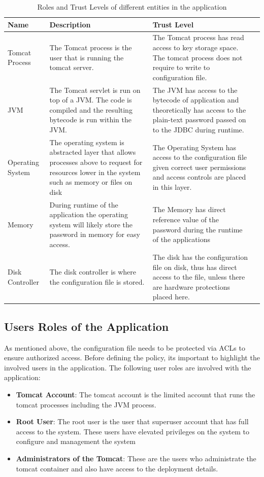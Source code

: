 \documentclass[11pt, a4paper, notitlepage]{article}
\begin{document}
\begin{table}[H]
\begin{tabularx}{\textwidth}{|X|X|X|X|}
\hline
\textbf{Name} & \textbf{Description} & \textbf{Trust Level} \\ \hline
Tomcat Process   & The Tomcat process is the user that is running the tomcat server. & The Tomcat process has read access to key storage space. The tomcat process does not require to write to configuration file. \\ \hline
JVM  & The Tomcat servlet is run on top of a JVM. The code is compiled and the resulting bytecode is run within the JVM.  & The JVM has access to the bytecode of application and theoretically has access to the plain-text password passed on to the JDBC during runtime. \\ \hline
Operating System & The operating system is abstracted layer that allows processes above to request for resources lower in the system such as memory or files on disk & The Operating System has access to the configuration file given correct user permissions and access controls are placed in this layer.  \\ \hline
Memory  & During runtime of the application the operating system will likely store the password in memory for easy access. & The Memory has direct reference value of the password during the runtime of the applications   \\ \hline
Disk Controller  & The disk controller is where the configuration file is stored.    & The disk has the configuration file on disk, thus has direct access to the file, unless there are hardware protections placed here. \\ \hline
\end{tabularx}
\caption{Roles and Trust Levels of different entities in the application}
\label{trust-level}
\end{table}

\subsection*{Users Roles of the Application}
As mentioned above, the configuration file needs to be protected via ACLs to ensure authorized access. Before defining the policy, its important to highlight the involved users in the application. The following user roles are involved with the application:
\begin{itemize}
\item \textbf{Tomcat Account}: The tomcat account is the limited account that runs the tomcat processes including the JVM process. 
\item \textbf{Root User}: The root user is the user that superuser account that has full access to the system. These users have elevated privileges on the system to configure and management the system
\item \textbf{Administrators of the Tomcat}: These are the users who administrate the tomcat container and also have access to the deployment details.
\end{itemize}
\end{document}
